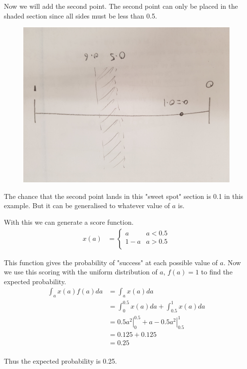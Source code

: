 \documentclass{article}
\begin{document}
Now we will add the second point. The second point can only be placed in the
shaded section since all sides must be less than 0.5.
\begin{figure}[H]
    \centering
    \includegraphics[width=5in]{b.jpg}
\end{figure}
The chance that the second point lands in this "sweet spot" section is 0.1 in
this example. But it can be generalised to whatever value of $a$ is.

With this we can generate a score function.
\begin{align*}
    x(a) &= 
    \begin{cases}
        a & a < 0.5 \\
        1 - a & a > 0.5 \\
    \end{cases}
\end{align*}

This function gives the probability of "success" at each possible value of $a$.
Now we use this scoring with the uniform distribution of $a$, $f(a) = 1$
to find the expected probability. 
\begin{align*}
    \int_a x(a) f(a) da &= \int_a x(a) da \\
    &= \int_0^{0.5} x(a) da + \int_{0.5}^1 x(a) da \\
    &= \left. 0.5 a^2 \right|_0^{0.5} + \left. a - 0.5 a^2 \right|_{0.5}^1 \\
    &= 0.125 + 0.125 \\
    &= 0.25 \\
\end{align*}

Thus the expected probability is 0.25.
\end{document}
